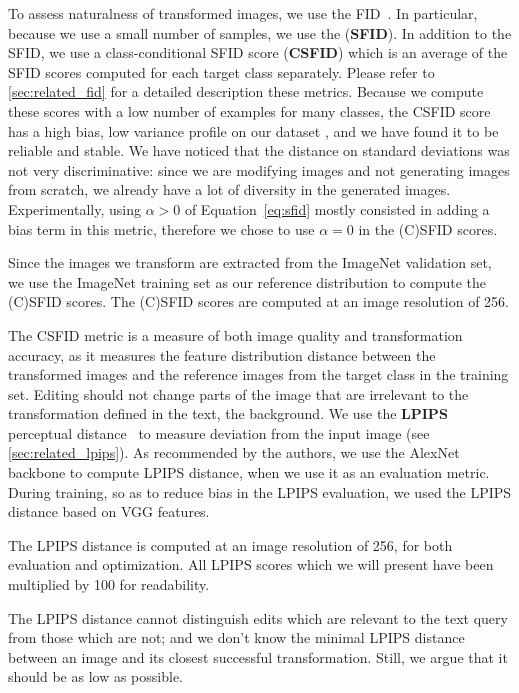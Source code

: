 To assess naturalness of  transformed images, we use the \ac{FID}~\citep{heusel2017gans}.
In particular, because we use a small number of samples, we use the (\textbf{\ac{SFID}}).
In addition to the \ac{SFID}, we use a class-conditional
 SFID score  (\textbf{CSFID}) which is an average of the \ac{SFID} scores computed for each 
 target class separately.
  Please refer to \ref{sec:related_fid} for a detailed description these metrics. 
 Because we compute these scores with a low number of examples 
  for many classes, the \ac{CSFID} score has a high bias, low variance profile on our
   dataset \citep{chong2020effectively}, and we  
 have found it to be reliable and stable. We have noticed that the distance on standard deviations was not very discriminative: 
 since we are modifying images and not generating images from scratch, we already have
  a lot of diversity in the generated images. 
  Experimentally, using $\alpha > 0$ of Equation~\ref{eq:sfid} mostly consisted in
   adding a bias term in this metric, therefore we chose to use $\alpha =0 $ in the (C)SFID scores. 

Since the images we transform are extracted from the ImageNet validation set, we use the ImageNet training set as our 
reference distribution to compute the (C)SFID scores. 
The (C)SFID scores are computed at an image resolution of 256.



The \ac{CSFID} metric is a measure of both image quality and transformation accuracy, as it 
measures the feature distribution distance between the transformed images and the 
reference images from the target class in the %
training set. 
Editing should not change parts of the image that are irrelevant to the transformation
 defined in the text,  \eg the background.  
We use the \textbf{LPIPS} perceptual distance~\citep{zhanglpips2018}  to measure deviation 
from the input image (see \ref{sec:related_lpips}). 
As recommended by the authors, we use the AlexNet~\cite{krizhevsky12nips} backbone to 
compute \ac{LPIPS} distance, when we use it as
an evaluation metric. During training, so as to reduce bias in the \ac{LPIPS} evaluation, we used the 
\ac{LPIPS} distance based on VGG features.

The \ac{LPIPS}  distance is computed at an image resolution of 256, for both evaluation and 
optimization.
All \ac{LPIPS}  scores which we will present have been multiplied by 100 for readability.

The \ac{LPIPS}  distance cannot distinguish edits which are relevant to the text 
query from those which are not; and we don't know the minimal \ac{LPIPS} distance between 
an image and its closest successful transformation. Still, we argue that it should be 
as low as possible.


